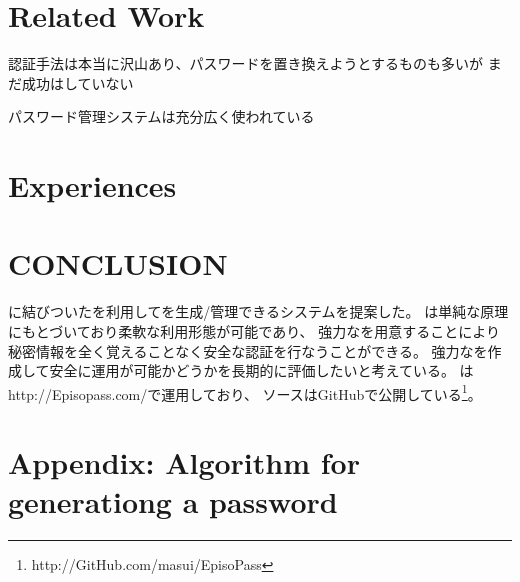 \documentclass{article}
\begin{document}
\section{Related Work}

認証手法は本当に沢山あり、パスワードを置き換えようとするものも多いが
まだ成功はしていない

パスワード管理システムは充分広く使われている

\cite{Stobert:2014:PMD:2683467.2683471} %

% 
% 
% 
% 
% 
%

\section{Experiences}


\section{CONCLUSION}

{\EM}に結びついた{\SQ}を利用して{\PW}を生成/管理できるシステム{\EP}を提案した。
{\EP}は単純な原理にもとづいており柔軟な利用形態が可能であり、
強力な{\SQ}を用意することにより
秘密情報を全く覚えることなく安全な認証を行なうことができる。
%
強力な{\SQ}を作成して安全に運用が可能かどうかを長期的に評価したいと考えている。
%
%
{\EP}は\textsf{http://Episopass.com/}で運用しており、
ソースはGitHubで公開している\footnote{
  \textsf{http://GitHub.com/masui/EpisoPass}
}。

{%


}

\section*{Appendix: Algorithm for generationg a password}
\end{document}
